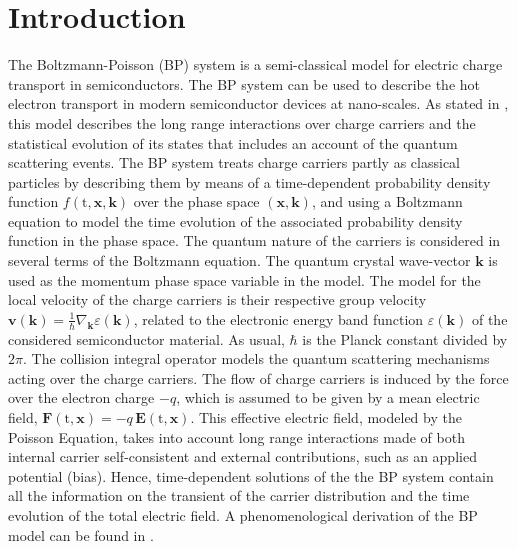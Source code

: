 \documentclass[11pt]{article}
\newcommand{\bk}{\mathbf{k}}
\newcommand{\bx}{\mathbf{x}}
\newcommand{\eps}{\varepsilon}
\newcommand{\bE}{\mathbf{E}}
\newcommand{\ti}{\mathrm{t}}
\newcommand{\enk}{\eps(\bk)}
\begin{document}
\section{Introduction}
%
The Boltzmann-Poisson (BP) system is a semi-classical model for electric charge transport in semiconductors. 
% 
The BP system can be used to describe the hot electron transport in modern 
semiconductor devices at nano-scales. As stated in \cite{ref:MarkowichRS}, this model describes the long range interactions over charge carriers 
and the statistical evolution of its states that includes an account of the
quantum scattering events. The BP system treats charge carriers partly as classical particles by describing 
them by means of a time-dependent probability density function $f(\ti,\bx,\bk)$ over the phase space 
$(\bx,\bk)$, and using a Boltzmann equation to model the time evolution of 
the associated 
probability density function in the phase space. 
The quantum nature of the carriers is considered in 
several terms of the Boltzmann equation. 
The quantum crystal wave-vector $\bk$ is used as the momentum phase space variable in the model.
The model for the local velocity of the charge carriers is their respective group velocity 
$\mathbf{v}(\bk) = \frac{1}{\hbar} \nabla_{\bk}\enk$, related to the electronic energy band function 
$\enk$ of the considered semiconductor material. 
As usual, $\hbar$ is the Planck constant divided by $2\pi$.
The collision integral operator models 
the quantum scattering mechanisms acting over the charge carriers. 
%
The flow of charge carriers is induced by the force over the electron charge $-q$, which is assumed 
to be given by a mean electric field,  $\mathbf{F}(\ti,\bx) = -q \, \bE(\ti,\bx)$. This 
effective electric field, modeled by the Poisson Equation, 
takes into account long range interactions made of both internal carrier 
self-consistent and external contributions, such as an applied potential (bias). 
Hence, time-dependent solutions of the the BP system contain all the information on the transient of the 
carrier distribution and the time evolution of the total electric field. A phenomenological 
derivation of the BP model can be found in \cite{ref:MarkowichRS}.
\end{document}
